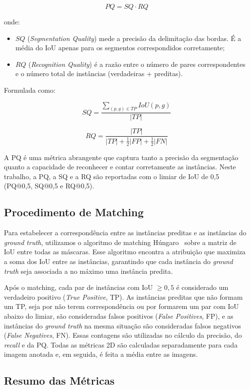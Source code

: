 \[
PQ = SQ \cdot RQ
\]

onde:
\begin{itemize}
    \item $SQ$ (\textit{Segmentation Quality}) mede a precisão da delimitação das bordas. É a média do IoU apenas para os segmentos correspondidos corretamente;
    \item $RQ$ (\textit{Recognition Quality}) é a razão entre o número de pares correspondentes e o número total de instâncias (verdadeiras + preditas).
\end{itemize}

Formulada como:

\[
SQ = \frac{\sum_{(p,g) \in TP} IoU(p,g)}{|TP|}
\]

\[
RQ = \frac{|TP|}{|TP| + \frac{1}{2}|FP| + \frac{1}{2}|FN|}
\]

A PQ é uma métrica abrangente que captura tanto a precisão da segmentação quanto a capacidade de reconhecer e contar corretamente as instâncias. Neste trabalho, a PQ, a SQ e a RQ são reportadas com o limiar de IoU de 0,5 (PQ@0,5, SQ@0,5 e RQ@0,5).

\subsection{Procedimento de Matching}
\label{sec:matching}

Para estabelecer a correspondência entre as instâncias preditas e as instâncias do \textit{ground truth}, utilizamos o algoritmo de matching Húngaro~\cite{kuhn1955hungarian} sobre a matriz de IoU entre todas as máscaras. Esse algoritmo encontra a atribuição que maximiza a soma dos IoU entre as instâncias, garantindo que cada instância do \textit{ground truth} seja associada a no máximo uma instância predita.

Após o matching, cada par de instâncias com IoU $\geq 0{,}5$ é considerado um verdadeiro positivo (\textit{True Positive}, TP). As instâncias preditas que não formam um TP, seja por não terem correspondência ou por formarem um par com IoU abaixo do limiar, são consideradas falsos positivos (\textit{False Positives}, FP), e as instâncias do \textit{ground truth} na mesma situação são consideradas falsos negativos (\textit{False Negatives}, FN). Essas contagens são utilizadas no cálculo da precisão, do \textit{recall} e da PQ. Todas as métricas 2D são calculadas separadamente para cada imagem anotada e, em seguida, é feita a média entre as imagens.

\subsection{Resumo das Métricas}

